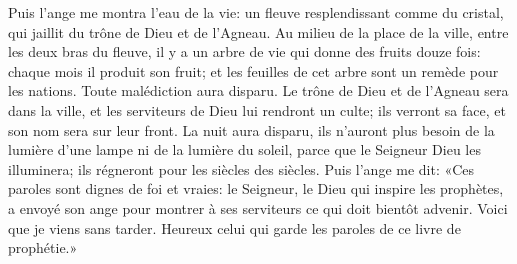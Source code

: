 Puis l’ange me montra l’eau de la vie:
	un fleuve resplendissant comme du cristal,
	qui jaillit du trône de Dieu et de l’Agneau.
Au milieu de la place de la ville, entre les deux bras du fleuve,
	il y a un arbre de vie qui donne des fruits douze fois:
	chaque mois il produit son fruit;
	et les feuilles de cet arbre sont un remède pour les nations.
Toute malédiction aura disparu.
	Le trône de Dieu et de l’Agneau sera dans la ville,
	et les serviteurs de Dieu lui rendront un culte;
	ils verront sa face, et son nom sera sur leur front.
La nuit aura disparu,
	ils n’auront plus besoin de la lumière d’une lampe ni de la lumière du soleil,
	parce que le Seigneur Dieu les illuminera;
	ils régneront pour les siècles des siècles.
Puis l’ange me dit:
	«Ces paroles sont dignes de foi et vraies:
	le Seigneur, le Dieu qui inspire les prophètes,
	a envoyé son ange pour montrer à ses serviteurs ce qui doit bientôt advenir.
Voici que je viens sans tarder.
	Heureux celui qui garde les paroles de ce livre de prophétie.»
